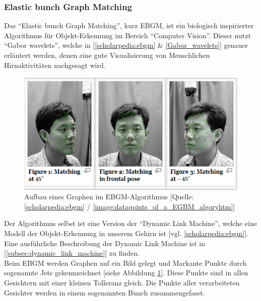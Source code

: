         \subsubsection{Elastic bunch Graph Matching}
        \label{subsubsec:Elastic_bunch_graph_Matching}

            Das \enquote{Elastic bunch Graph Matching}, kurz EBGM, ist ein biologisch inspirierter Algorithmus für Objekt-Erkennung im Bereich \enquote{Computer Vision}. Dieser nutzt \enquote{Gabor wavelets}, welche in [\ref{scholarpedia:ebgm} \& \ref{Gabor_wavelets}] genauer erläutert werden, denen eine gute Visualisierung von Menschlichen Hirnaktivitäten nachgesagt wird.
            \begin{center}
                \begin{figure}[ht]
                    \centering
                    \includegraphics[scale=0.8]{resources/images/img/Face recognition/Elastic Bunch Graph Matching - Figures.png}
                    \caption{Aufbau eines Graphen im EBGM-Algorithmus [Quelle: \ref{scholarpedia:ebgm} / \ref{image:datapoints_of_a_EGBM_algoryhtm}]}
                    \label{fig:Datenpunkte_eines_EGBM-Algorithms}
                \end{figure}
            \end{center}
            Der Algorithmus selbst ist eine Version der \enquote{Dynamic Link Machine}, welche eine Modell der Objekt-Erkennung in unserem Gehirn ist [vgl. \ref{scholarpedia:ebgm}]. Eine ausführliche Beschreibung der Dynamic Link Machine ist in [\ref{subsec:dynamic_link_machine}] zu finden.\\
            Beim EBGM werden Graphen auf ein Bild gelegt und Markante Punkte durch sogenannte Jets gekennzeichnet [siehe Abbildung \ref{fig:Datenpunkte_eines_EGBM-Algorithms}]. Diese Punkte sind in allen Gesichtern mit einer kleinen Tolleranz gleich. Die Punkte aller verarbeiteten Gesichter werden in einem sogenannten Bunch zusammengefasst.

                

            